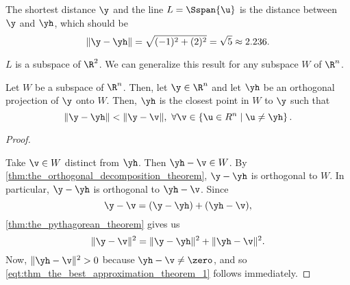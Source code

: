 \begin{figure}[H]
  \centering


  \caption{}
  \label{fig:}
\end{figure}

The shortest distance $\y$ and the line $L = \Sspan\{\u\}$ is the distance
between $\y$ and $\yh$, which should be
\[%
  \lVert \y-\yh \rVert = \sqrt{(-1)^2 + (2)^2} = \sqrt{5} \approx 2.236
.\]%

\begin{note}
  \label{nte:l_is_a_subspace_of_r_two}

  $L$ is a subspace of $\R^2$. We can generalize this result for any subspace $W$ of $\R^n$.
\end{note}

\begin{theorem}
  \label{thm:the_best_approximation_theorem}

  Let $W$ be a subspace of $\R^n$. Then, let $\y \in \R^n$ and let $\yh$ be an
  orthogonal projection of $\y$ onto $W$. Then, $\yh$ is the closest point in
  $W$ to $\y$ such that
  \begin{equation}\label{eqt:thm_the_best_approximation_theorem_1}
    \lVert \y - \yh \rVert < \lVert \y - \v \rVert,~\forall \v \in \left\{\u \in R^n \mid \u \ne \yh\right\}
  .\end{equation}
\end{theorem}

\begin{proof}
  \label{prf:the_best_approximation_theorem}

  Take $\v \in W$ distinct from $\yh$. Then $\yh - \v \in W$. By
  \cref{thm:the_orthogonal_decomposition_theorem}, $\y - \yh$ is orthogonal to
  $W$. In particular, $\y - \yh$ is orthogonal to $\yh - \v$. Since
  \[%
    \y - \v = (\y - \yh) + (\yh - \v)
  ,\]%
  \cref{thm:the_pythagorean_theorem} gives us
  \[%
    \lVert \y - \v \rVert^2 = \lVert \y - \yh \rVert^2 + \lVert \yh - \v \rVert^2
  .\]%
  Now, $\lVert \yh - \v \rVert^2 > 0$ because $\yh - \v \ne \zero$, and so
  \cref{eqt:thm_the_best_approximation_theorem_1} follows immediately.
\end{proof}

